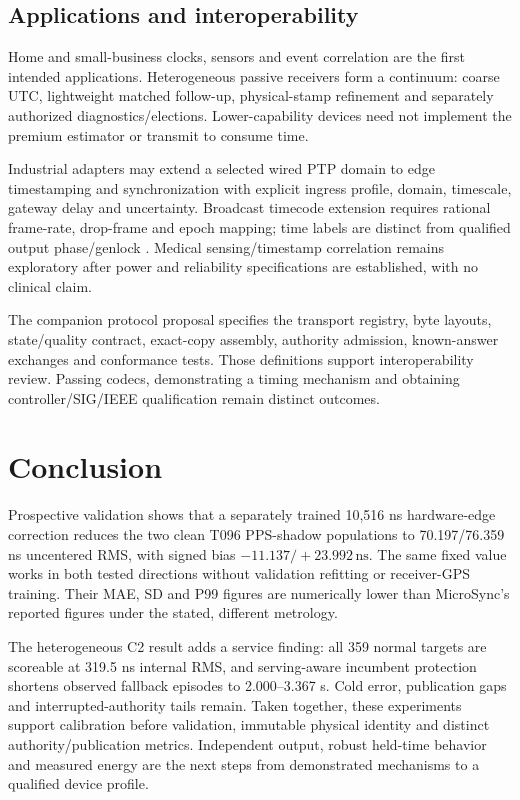 \documentclass[11pt,letterpaper]{article}
\newcommand{\ns}{\,\mathrm{ns}}
\begin{document}
\subsection{Applications and interoperability}
Home and small-business clocks, sensors and event correlation are the first intended applications. Heterogeneous passive receivers form a continuum: coarse UTC, lightweight matched follow-up, physical-stamp refinement and separately authorized diagnostics/elections. Lower-capability devices need not implement the premium estimator or transmit to consume time.

Industrial adapters may extend a selected wired PTP domain to edge timestamping and synchronization with explicit ingress profile, domain, timescale, gateway delay and uncertainty. Broadcast timecode extension requires rational frame-rate, drop-frame and epoch mapping; time labels are distinct from qualified output phase/genlock \cite{ptp,smpte}. Medical sensing/timestamp correlation remains exploratory after power and reliability specifications are established, with no clinical claim.

The companion protocol proposal specifies the transport registry, byte layouts, state/quality contract, exact-copy assembly, authority admission, known-answer exchanges and conformance tests. Those definitions support interoperability review. Passing codecs, demonstrating a timing mechanism and obtaining controller/SIG/IEEE qualification remain distinct outcomes.

\section{Conclusion}
Prospective validation shows that a separately trained 10,516 ns hardware-edge correction reduces the two clean T096 PPS-shadow populations to 70.197/76.359 ns uncentered RMS, with signed bias $-11.137/+23.992\ns$. The same fixed value works in both tested directions without validation refitting or receiver-GPS training. Their MAE, SD and P99 figures are numerically lower than MicroSync's reported figures under the stated, different metrology.

The heterogeneous C2 result adds a service finding: all 359 normal targets are scoreable at 319.5 ns internal RMS, and serving-aware incumbent protection shortens observed fallback episodes to 2.000--3.367 s. Cold error, publication gaps and interrupted-authority tails remain. Taken together, these experiments support calibration before validation, immutable physical identity and distinct authority/publication metrics. Independent output, robust held-time behavior and measured energy are the next steps from demonstrated mechanisms to a qualified device profile.
\end{document}
